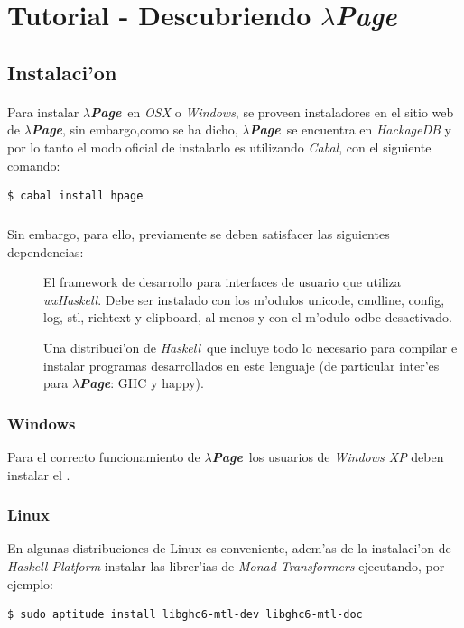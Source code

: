 \documentclass[a4paper]{article}
\newcommand{\haskell}{\textsl{Haskell}}
\newcommand{\hpage}{\textbf{\textsl{$\lambda$Page}}}
\begin{document}
\section{Tutorial - Descubriendo \hpage}
\subsection{Instalaci'on}
\paragraph{}Para instalar \hpage\ en \textsl{OSX} o \textsl{Windows}, se proveen instaladores en el sitio web de \hpage, sin embargo,como se ha dicho, \hpage\ se encuentra en \textsl{HackageDB} y por lo tanto el modo oficial de instalarlo es utilizando \textsl{Cabal}, con el siguiente comando:
\lstset{language=sh, frame=single, tabsize=2}
\begin{lstlisting}
$ cabal install hpage
\end{lstlisting}
\subparagraph{}Sin embargo, para ello, previamente se deben satisfacer las siguientes dependencias:
\begin{description}
	\item[] El framework de desarrollo para interfaces de usuario que utiliza \textsl{wxHaskell}.  Debe ser instalado con los m'odulos unicode, cmdline, config, log, stl, richtext y clipboard, al menos y con el m'odulo odbc desactivado.
	\item[] Una distribuci'on de \haskell\ que incluye todo lo necesario para compilar e instalar programas desarrollados en este lenguaje (de particular inter'es para \hpage: GHC y happy).
\end{description}
\subsubsection{Windows}Para el correcto funcionamiento de \hpage\ los usuarios de \textsl{Windows XP} deben instalar el .
\subsubsection{Linux}En algunas distribuciones de Linux es conveniente, adem'as de la instalaci'on de \textsl{Haskell Platform} instalar las librer'ias de \textit{Monad Transformers} ejecutando, por ejemplo:
\begin{lstlisting}
$ sudo aptitude install libghc6-mtl-dev libghc6-mtl-doc
\end{lstlisting}
\newpage
\end{document}
